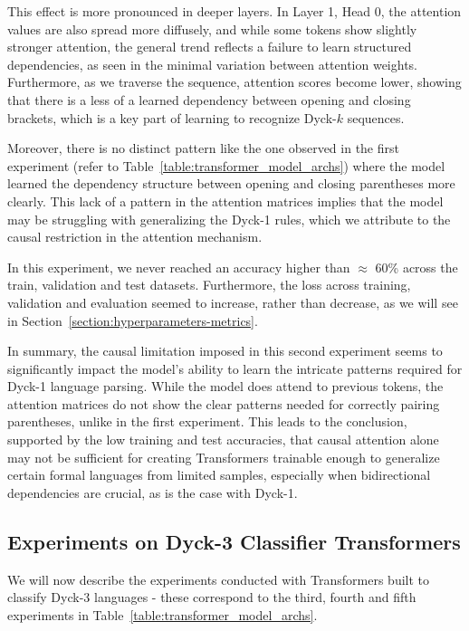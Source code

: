This effect is more pronounced in deeper layers. In Layer 1, Head 0, the attention values are also spread more diffusely, and while some tokens show slightly stronger attention, the general trend reflects a failure to learn structured dependencies, as seen in the minimal variation between attention weights. Furthermore, as we traverse the sequence, attention scores become lower, showing that there is a less of a learned dependency between opening and closing brackets, which is a key part of learning to recognize Dyck-$k$ sequences.

Moreover, there is no distinct pattern like the one observed in the first experiment (refer to Table~\ref{table:transformer_model_archs}) where the model learned the dependency structure between opening and closing parentheses more clearly. This lack of a pattern in the attention matrices implies that the model may be struggling with generalizing the Dyck-1 rules, which we attribute to the causal restriction in the attention mechanism.

In this experiment, we never reached an accuracy higher than $\approx$ 60\% across the train, validation and test datasets. Furthermore, the loss across training, validation and evaluation seemed to increase, rather than decrease, as we will see in Section~\ref{section:hyperparameters-metrics}.

In summary, the causal limitation imposed in this second experiment seems to significantly impact the model’s ability to learn the intricate patterns required for Dyck-1 language parsing. While the model does attend to previous tokens, the attention matrices do not show the clear patterns needed for correctly pairing parentheses, unlike in the first experiment. This leads to the conclusion, supported by the low training and test accuracies, that causal attention alone may not be sufficient for creating Transformers trainable enough to generalize certain formal languages from limited samples, especially when bidirectional dependencies are crucial, as is the case with Dyck-1.

\subsection{Experiments on Dyck-3 Classifier Transformers}

We will now describe the experiments conducted with Transformers built to classify Dyck-3 languages - these correspond to the third, fourth and fifth experiments in Table~\ref{table:transformer_model_archs}.

